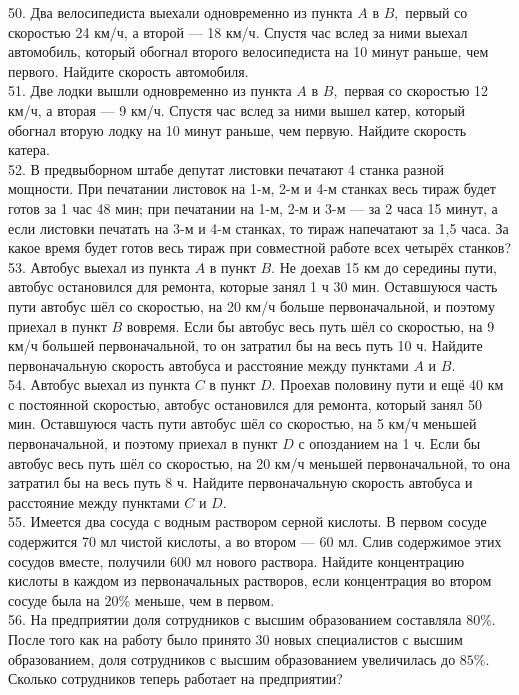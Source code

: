 50. Два велосипедиста выехали одновременно из пункта $A$ в $B,$ первый со скоростью 24 км/ч, а второй --- 18 км/ч. Спустя час вслед за ними выехал автомобиль, который обогнал второго велосипедиста на 10 минут раньше, чем первого. Найдите скорость автомобиля.\\
51. Две лодки вышли одновременно из пункта $A$ в $B,$ первая со скоростью 12 км/ч, а вторая --- 9 км/ч. Спустя час вслед за ними вышел катер, который обогнал вторую лодку на 10 минут раньше, чем первую. Найдите скорость катера.\\
52. В предвыборном штабе депутат листовки печатают 4 станка разной мощности. При печатании листовок на 1-м, 2-м и 4-м станках весь тираж будет готов за 1 час 48 мин; при печатании на 1-м, 2-м и 3-м --- за 2 часа 15 минут, а если листовки печатать на 3-м и 4-м станках, то тираж напечатают за 1,5 часа. За какое время будет готов весь тираж при совместной работе всех четырёх станков?\\
53. Автобус выехал из пункта $A$ в пункт $B.$ Не доехав 15 км до середины пути, автобус остановился для ремонта, которые занял 1 ч 30 мин. Оставшуюся часть пути автобус шёл со скоростью, на 20 км/ч больше первоначальной, и поэтому приехал в пункт $B$ вовремя. Если бы автобус весь путь шёл со скоростью, на 9 км/ч большей первоначальной, то он затратил бы на весь путь 10 ч. Найдите первоначальную скорость автобуса и расстояние между пунктами $A$ и $B.$\\
54. Автобус выехал из пункта $C$ в пункт $D.$ Проехав половину пути и ещё 40 км с постоянной скоростью, автобус остановился для ремонта, который занял 50 мин.  Оставшуюся часть пути автобус шёл со скоростью, на 5 км/ч меньшей первоначальной, и поэтому приехал в пункт $D$ с опозданием на 1 ч. Если бы автобус весь путь шёл со скоростью, на 20 км/ч меньшей первоначальной, то она затратил бы на весь путь 8 ч. Найдите первоначальную скорость автобуса и расстояние между пунктами $C$ и $D.$\\
55. Имеется два сосуда с водным раствором серной кислоты. В первом сосуде содержится 70 мл чистой кислоты, а во втором --- 60 мл. Слив содержимое этих сосудов вместе, получили 600 мл нового раствора. Найдите концентрацию кислоты в каждом из первоначальных растворов, если концентрация во втором сосуде была на $20\%$ меньше, чем в первом.\\
56. На предприятии доля сотрудников с высшим образованием составляла $80\%.$ После того как на работу было принято 30 новых специалистов с высшим образованием, доля сотрудников с высшим образованием увеличилась до $85\%.$ Сколько сотрудников теперь работает на предприятии?\\
